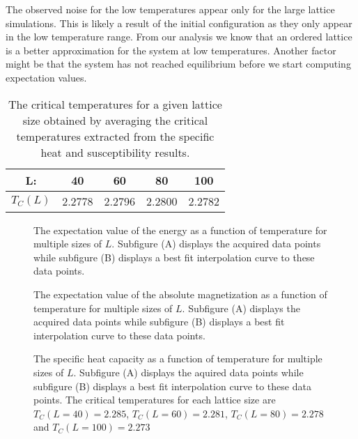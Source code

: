 \documentclass[a4paper, 10pt, reqno]{amsart}
\begin{document}
The observed noise for the low temperatures appear only for the large lattice simulations. This is likely a result of the initial configuration as they only appear in the low temperature range. From our analysis we know that an ordered lattice is a better approximation for the system at low temperatures. Another factor might be that the system has not reached equilibrium before we start computing expectation values.


\begin{table}[]
\caption{The critical temperatures for a given lattice size obtained by averaging the critical temperatures extracted from the specific heat and susceptibility results.}
\label{tab: T_C}
\begin{tabular}{|c|c|c|c|c|}
\hline
L:       & 40     & 60     & 80     & 100    \\ \hline
$T_C(L)$ & 2.2778 & 2.2796 & 2.2800 & 2.2782 \\ \hline
\end{tabular}
\end{table}

\begin{figure}
     \centering
     \caption{The expectation value of the energy as a function of temperature for multiple sizes of $L$. Subfigure (A) displays the acquired data points while subfigure (B) displays a best fit interpolation curve to these data points.}
     \label{fig: temp E}
\end{figure}

\begin{figure}
     \centering
     \caption{The expectation value of the absolute magnetization as a function of temperature for multiple sizes of $L$. Subfigure (A) displays the acquired data points while subfigure (B) displays a best fit interpolation curve to these data points.}
     \label{fig: temp absM}
\end{figure}

\begin{figure}
     \centering
     \caption{The specific heat capacity as a function of temperature for multiple sizes of $L$. Subfigure (A) displays the aquired data points while subfigure (B) displays a best fit interpolation curve to these data points. The critical temperatures for each lattice size are $T_C(L=40)=2.285$, $T_C(L=60)=2.281$, $T_C(L=80)=2.278$ and $T_C(L=100)=2.273$}
     \label{fig: temp CV}
\end{figure}
\end{document}
